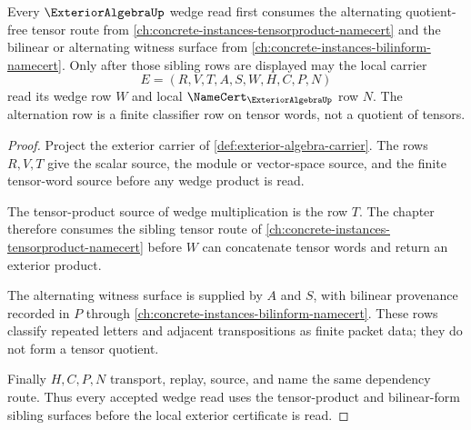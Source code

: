 \begin{theorem}
\label{thm:exterior-algebra-tensor-product-dependency-route}
Every $\ExteriorAlgebraUp$ wedge read first consumes the alternating quotient-free tensor route from \autoref{ch:concrete-instances-tensorproduct-namecert} and the bilinear or alternating witness surface from \autoref{ch:concrete-instances-bilinform-namecert}. Only after those sibling rows are displayed may the local carrier
$$
E=(R,V,T,A,S,W,H,C,P,N)
$$
read its wedge row $W$ and local $\NameCert_{\ExteriorAlgebraUp}$ row $N$. The alternation row is a finite classifier row on tensor words, not a quotient of tensors.
\end{theorem}
\begin{proof}
Project the exterior carrier of \autoref{def:exterior-algebra-carrier}. The rows $R,V,T$ give the scalar source, the module or vector-space source, and the finite tensor-word source before any wedge product is read.

The tensor-product source of wedge multiplication is the row $T$. The chapter therefore consumes the sibling tensor route of \autoref{ch:concrete-instances-tensorproduct-namecert} before $W$ can concatenate tensor words and return an exterior product.

The alternating witness surface is supplied by $A$ and $S$, with bilinear provenance recorded in $P$ through \autoref{ch:concrete-instances-bilinform-namecert}. These rows classify repeated letters and adjacent transpositions as finite packet data; they do not form a tensor quotient.

Finally $H,C,P,N$ transport, replay, source, and name the same dependency route. Thus every accepted wedge read uses the tensor-product and bilinear-form sibling surfaces before the local exterior certificate is read.
\end{proof}



